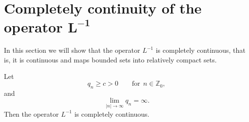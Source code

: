 \section[Completely continuity of the operator $L^{-1}$]{Completely continuity of the operator $\boldsymbol{L^{-1}}$}\label{section7}


In this section we will show that the operator $L^{-1}$ is completely
continuous, that is, it is continuous and maps bounded sets into relatively
compact sets.

\begin{theorem}
\label{Th7.1}Let%
\begin{equation}
q_{n}\geq c>0\qquad \text{for} \ \ n\in
\mathbb{Z}_{0},  \label{7.1}
\end{equation}%
and
\begin{equation}
\lim_{\left\vert n\right\vert \rightarrow \infty }q_{n}=\infty .  \label{7.2}
\end{equation}%
Then the operator $L^{-1}$ is completely continuous.
\end{theorem}

